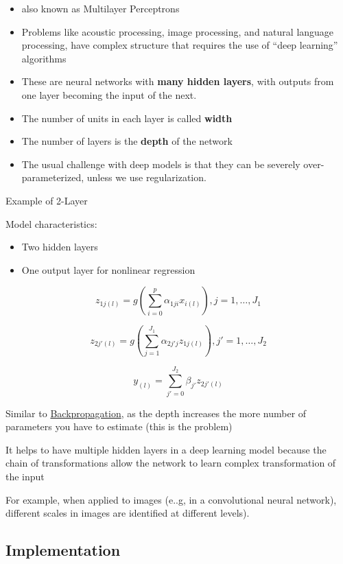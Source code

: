 \documentclass[
]{book}
\begin{document}
\begin{itemize}
\item
  also known as Multilayer Perceptrons
\item
  Problems like acoustic processing, image processing, and natural language processing, have complex structure that requires the use of ``deep learning'' algorithms
\item
  These are neural networks with \textbf{many hidden layers}, with outputs from one layer becoming the input of the next.
\item
  The number of units in each layer is called \textbf{width}
\item
  The number of layers is the \textbf{depth} of the network
\item
  The usual challenge with deep models is that they can be severely over-parameterized, unless we use regularization.
\end{itemize}

Example of 2-Layer

Model characteristics:

\begin{itemize}
\item
  Two hidden layers
\item
  One output layer for nonlinear regression
\end{itemize}

\[
z_{1j(l)} = g(\sum_{i=0}^p \alpha_{1ji} x_{i(l)}), j = 1, \dots, J_1
\]

\[
z_{2j'(l)} = g(\sum_{j=1}^{J_1} \alpha_{2j'j}z_{1j(l)}), j' = 1, \dots, J_2
\]

\[
y_{(l)} = \sum_{j'=0}^{J_2} \beta_{j'} z_{2j'(l)}
\]

Similar to \protect\hyperlink{backpropagation}{Backpropagation}, as the depth increases the more number of parameters you have to estimate (this is the problem)

It helps to have multiple hidden layers in a deep learning model because the chain of transformations allow the network to learn complex transformation of the input

For example, when applied to images (e..g, in a convolutional neural network), different scales in images are identified at different levels).

\hypertarget{implementation}{%
\subsection{Implementation}\label{implementation}}
\end{document}
